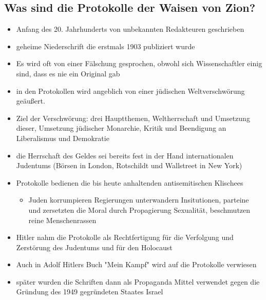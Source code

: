 \documentclass[12pt, a4paper, openany]{report}
\begin{document}
\subsection{Was sind die Protokolle der Waisen von Zion?}
\begin{itemize}
	\item Anfang des 20. Jahrhunderts von unbekannten Redakteuren geschrieben
	\item geheime Niederschrift die erstmals 1903 publiziert wurde
	\item Es wird oft von einer Fälschung gesprochen, obwohl sich Wissenschaftler einig sind, dass es nie ein Original gab 
	\item in den Protokollen wird angeblich von einer jüdischen Weltverschwörung geäußert.
	\item Ziel der Verschwörung: drei Hauptthemen, Weltherrschaft und Umsetzung dieser, Umsetzung jüdischer Monarchie, Kritik und Beendigung an Liberalismus und Demokratie
	\item die Herrschaft des Geldes sei bereits fest in der Hand internationalen Judentums (Börsen in London, Rotschildt und Wallstreet in New York)
	\item Protokolle bedienen die bis heute anhaltenden antisemitischen Klischees 
         \begin{itemize}
            \item Juden korrumpieren Regierungen unterwandern Insitutionen, parteine und zersetzten die Moral durch Propagierung Sexualität, beschmutzen reine Menschenrassen
         \end{itemize}
	\item Hitler nahm die Protokolle als Rechtfertigung für die Verfolgung und Zerstörung des Judentums und für den Holocaust
	\item Auch in Adolf Hitlers Buch "Mein Kampf" wird auf die Protokolle verwiesen
	\item später wurden die Schriften dann als Propaganda Mittel verwendet gegen die Gründung des 1949 gegründeten Staates Israel 
\end{itemize}
\end{document}
